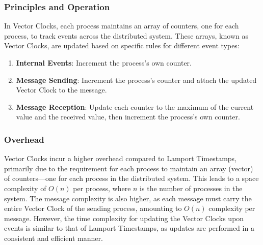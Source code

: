\documentclass{article}
\begin{document}
    \subsubsection{Principles and Operation}\label{sec:vector_clocks}
    In Vector Clocks, each process maintains an array of counters, one for each process, to track events across the distributed system. These arrays, known as Vector Clocks, are updated based on specific rules for different event types:
    \begin{enumerate}
    \item \textbf{Internal Events}: Increment the process's own counter.
    \item \textbf{Message Sending}: Increment the process's counter and attach the updated Vector Clock to the message.
    \item \textbf{Message Reception}: Update each counter to the maximum of the current value and the received value, then increment the process's own counter.
    \end{enumerate}
    

    \subsubsection{Overhead}
    Vector Clocks incur a higher overhead compared to Lamport Timestamps, primarily due to the requirement for each process to maintain an array (vector) of counters—one for each process in the distributed system. This leads to a space complexity of $O(n)$ per process, where $n$ is the number of processes in the system. The message complexity is also higher, as each message must carry the entire Vector Clock of the sending process, amounting to $O(n)$ complexity per message. However, the time complexity for updating the Vector Clocks upon events is similar to that of Lamport Timestamps, as updates are performed in a consistent and efficient manner.
    
\end{document}
